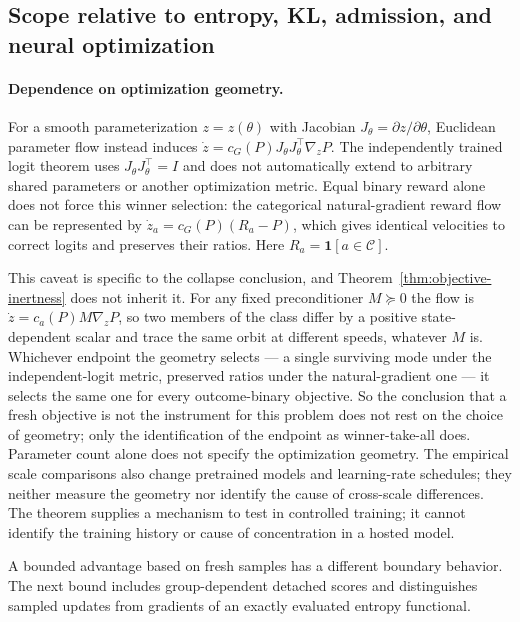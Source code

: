 \documentclass{article}
\newcommand{\1}{\mathbf 1}
\theoremstyle{remark}
\theoremstyle{definition}
\theoremstyle{plain}
\begin{document}
\subsection{Scope relative to entropy, KL, admission, and neural optimization}
\label{app:theory-entropy}
\label{app:theory-entropy-comparison}

\paragraph{Dependence on optimization geometry.}
For a smooth parameterization $z=z(\theta)$ with Jacobian
$J_\theta=\partial z/\partial\theta$, Euclidean parameter flow instead
induces $\dot z=c_G(P)J_\theta J_\theta^\top\nabla_zP$. The independently
trained logit theorem uses $J_\theta J_\theta^\top=I$ and does not automatically
extend to arbitrary shared parameters or another optimization metric. Equal
binary reward alone does not force this winner selection: the categorical
natural-gradient reward flow can be represented by
$\dot z_a=c_G(P)(R_a-P)$, which gives identical velocities to correct logits
and preserves their ratios. Here $R_a=\1[a\in\mathcal C]$.

This caveat is specific to the collapse conclusion, and
Theorem~\ref{thm:objective-inertness} does not inherit it. For any fixed
preconditioner $M\succeq0$ the flow is $\dot z=c_a(P)M\nabla_zP$, so two
members of the class differ by a positive state-dependent scalar and trace the
same orbit at different speeds, whatever $M$ is. Whichever endpoint the
geometry selects --- a single surviving mode under the independent-logit
metric, preserved ratios under the natural-gradient one --- it selects the same
one for every outcome-binary objective. So the conclusion that a fresh
objective is not the instrument for this problem does not rest on the choice of
geometry; only the identification of the endpoint as winner-take-all does.
Parameter count alone does not specify the optimization geometry. The empirical
scale
comparisons also change pretrained models and learning-rate schedules; they
neither measure the geometry nor identify the cause of cross-scale differences.
The theorem supplies a mechanism to test in controlled training; it cannot
identify the training history or cause of concentration in a hosted model.

A bounded advantage based on fresh samples has a different boundary behavior.
The next bound includes group-dependent detached scores and distinguishes
sampled updates from gradients of an exactly evaluated entropy functional.
\end{document}
